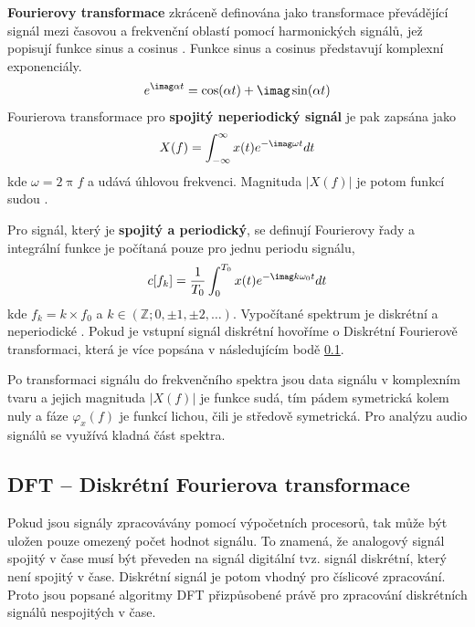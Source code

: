   \textbf{Fourierovy transformace} zkráceně definována jako transformace převádějící signál mezi časovou a frekvenční oblastí pomocí harmonických signálů, jež popisují funkce sinus a cosinus \cite{bracewell1978fourier}. Funkce sinus a cosinus představují komplexní exponenciály.
  \begin{equation}
    e^{\imag \alpha t} = \cos(\alpha t) + \imag \sin(\alpha t)
  \end{equation}
  Fourierova transformace pro \textbf{ spojitý neperiodický signál} je pak zapsána jako
  \begin{equation}
    X(f) = \int_{-\infty}^{\infty} x(t) e^{-\imag\omega t} dt
  \end{equation}
  kde $\omega = 2\uppi f$ a udává úhlovou frekvenci. Magnituda $|X(f)|$ je potom funkcí sudou \cite{sneddon1995fourier}.

  Pro signál, který je \textbf{spojitý a periodický}, se definují Fourierovy řady a integrální funkce je počítaná pouze pro jednu periodu signálu,
  \begin{equation}
    c[f_k] = \frac{1}{T_0} \int_{0}^{T_0} x(t) e^{-\imag k \omega_0 t} dt
  \end{equation}
  kde $f_k = k \times f_0$ a $k \in (\mathbb{Z}; 0, \pm 1, \pm 2, \dots)$. Vypočítané spektrum je diskrétní a neperiodické \cite{sneddon1995fourier}. Pokud je vstupní signál diskrétní hovoříme o Diskrétní Fourierově transformaci, která je více popsána v následujícím bodě \ref{sec:DFT}.

 Po transformaci signálu do frekvenčního spektra jsou data signálu v komplexním tvaru a jejich magnituda $|X(f)|$ je funkce sudá, tím pádem symetrická kolem nuly a fáze $\varphi_x(f)$ je funkcí lichou, čili je středově symetrická. Pro analýzu audio signálů se využívá kladná část spektra.

  \subsection{DFT -- Diskrétní Fourierova transformace} \label{sec:DFT}

  Pokud jsou signály zpracovávány pomocí výpočetních procesorů,
  tak může být uložen pouze omezený počet hodnot signálu.
  To znamená, že analogový signál spojitý v čase musí být převeden na signál digitální tvz. signál diskrétní, který není spojitý v čase. 
  Diskrétní signál je potom vhodný pro číslicové zpracování.
  Proto jsou popsané algoritmy \acs{DFT} přizpůsobené právě pro zpracování diskrétních signálů nespojitých v čase.


